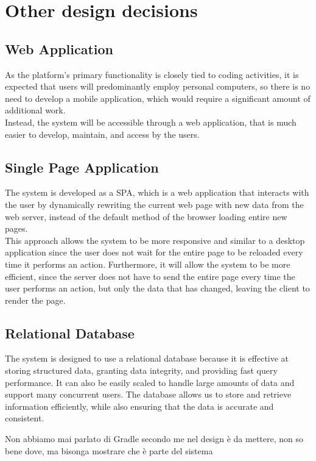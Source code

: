 \section{Other design decisions}
\subsection{Web Application}
As the platform's primary functionality is closely tied to coding activities, it is expected that users will predominantly employ personal computers, so there is no need to develop a mobile application, which would require a significant amount of additional work. \\
Instead, the system will be accessible through a web application, that is much easier to develop, maintain, and access by the users.

\subsection{Single Page Application}
The system is developed as a SPA, which is a web application that interacts with the user by dynamically rewriting the current web page with new data from the web server, instead of the default method of the browser loading entire new pages.\\
This approach allows the system to be more responsive and similar to a desktop application since the user does not wait for the entire page to be reloaded every time it performs an action. 
Furthermore, it will allow the system to be more efficient, since the server does not have to send the entire page every time the user performs an action, but only the data that has changed, leaving the client to render the page.

\subsection{Relational Database}
The system is designed to use a relational database because it is effective at storing structured data, granting data integrity, and providing fast query performance. 
It can also be easily scaled to handle large amounts of data and support many concurrent users. 
The database allows us to store and retrieve information efficiently, while also ensuring that the data is accurate and consistent.

{\color{red}Non abbiamo mai parlato di Gradle secondo me nel design è da mettere, non so bene dove, ma bisonga mostrare che è parte del sistema \\}
